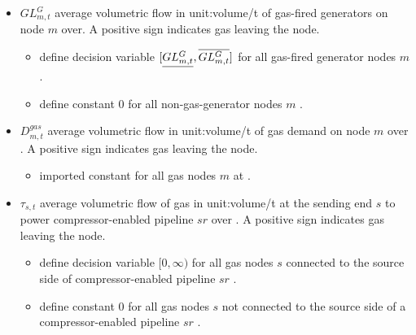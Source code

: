 \begin{itemize}
\item $GL^G_{m,t}$ average volumetric flow in \gls{unit:volume/t} of gas-fired
generators on node $m$ over\intervaloft{}. A positive sign indicates gas leaving
  the node.  \begin{itemize} \item \gls{define} decision variable
  $[\underline{GL^G_{m,t}}, \overline{GL^G_{m,t}}]$ for all gas-fired generator nodes
  $m$ \atallt{}.  \item \gls{define} constant $0$ for all non-gas-generator
  nodes $m$ \atallt{}.  \end{itemize}

\item $D^{gas}_{m,t}$ average volumetric flow in \gls{unit:volume/t} of gas demand
on node $m$ over \intervaloft{}. A positive sign indicates gas leaving the
  node.  \begin{itemize} \item \gls{imported} constant for all gas nodes $m$
  at \atallt{}.  \end{itemize}

\item $\tau_{s,t}$ average volumetric flow of gas in \gls{unit:volume/t}
at the sending end $s$ to power compressor-enabled pipeline $sr$
  over \intervaloft{}. A positive sign indicates gas leaving the
  node.  \begin{itemize} \item \gls{define}{} decision variable $[0, \infty)$
  for all gas nodes $s$ connected to the source side of compressor-enabled
  pipeline $sr$ \atallt{}.

  \item \gls{define}{} constant $0$ for all gas nodes $s$ not connected to the
    source side of a compressor-enabled pipeline $sr$ \atallt{}.  \end{itemize}


\end{itemize}
